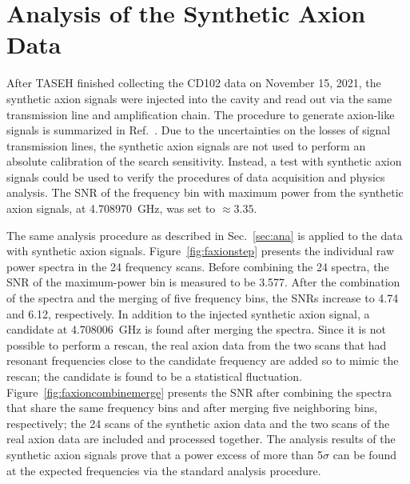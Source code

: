 \section{Analysis of the Synthetic Axion Data}\label{sec:faxion}
After TASEH finished collecting the CD102 data on November 15, 2021, 
the synthetic axion signals were injected into the cavity and read out via the 
same transmission line and amplification chain. The procedure 
to generate axion-like signals is summarized in 
Ref.~\cite{TASEHInstrumentation}. 
Due to the uncertainties on the losses of signal transmission
 lines, the synthetic axion signals are not used to perform an absolute 
calibration of the search sensitivity. Instead, 
a test with synthetic axion signals could be used to verify the procedures of 
data acquisition and physics analysis. The 
SNR of the frequency bin with maximum power from the 
synthetic axion signals, at 4.708970~GHz, was set to $\approx 3.35$.%

The same analysis procedure as described in Sec.~\ref{sec:ana} is applied 
to the data with synthetic axion signals. 
Figure~\ref{fig:faxionstep} presents the individual raw power spectra in 
the 24 frequency scans. Before combining 
the 24 spectra, the SNR of the maximum-power bin is measured to be 
3.577. %
After the combination of the spectra and the merging of five frequency 
bins, the SNRs increase to 4.74 and 6.12, respectively. In addition to the 
injected synthetic axion signal, a candidate at 4.708006~GHz is found after 
merging the spectra. Since it is not possible to perform a rescan, 
the real axion data from the two scans that had resonant frequencies close to 
the candidate frequency are added so to mimic the rescan; the candidate is 
found to be a statistical fluctuation.  
Figure~\ref{fig:faxioncombinemerge} presents 
the SNR after combining the spectra that share the same frequency bins and 
after merging five neighboring bins, respectively; the 24 scans of the 
synthetic axion data and the two 
scans of the real axion data are included and processed together. 
The analysis results of the synthetic axion signals prove that a power 
excess of more than 5$\sigma$ can be found at the expected frequencies via 
the standard analysis procedure.  

